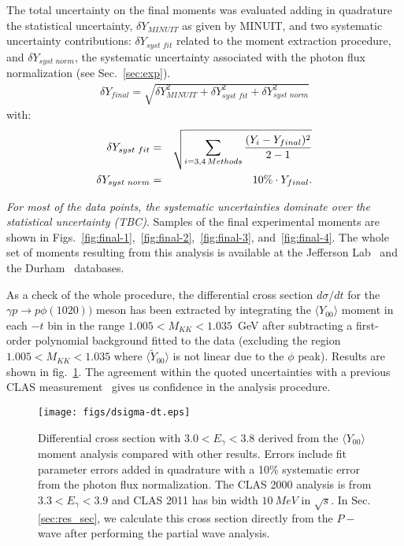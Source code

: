 \documentclass[twocolumn,superscriptaddress,prd]{revtex4}
\begin{document}
The total uncertainty on the final moments was evaluated adding in quadrature
the statistical uncertainty, $\delta Y_{MINUIT}$ as given by MINUIT, and two systematic uncertainty contributions:
$\delta Y_{syst\,\, fit}$ related to the moment extraction procedure, 
and $\delta Y_{syst\,\,  norm}$, the systematic uncertainty  associated with the photon flux normalization (see Sec.~\ref{sec:exp}).
\begin{eqnarray}
\delta Y_{final}=\sqrt{\delta Y_{MINUIT}^2+\delta Y_{syst\,\, fit}^2+\delta Y_{syst\,\, norm}^2}\label{eq:err_Y}
\end{eqnarray}
with:\\
\begin{eqnarray}
\delta Y_{syst\,\,  fit}&=&\sqrt{\sum_{i=3,4 \, Methods}{({Y_i}-Y_{final})^2\over{2-1}}}\\
\delta Y_{syst\,\,  norm}& =& 10\% \cdot Y_{final}.
\end{eqnarray}

{\it For most of  the data points, the systematic uncertainties dominate over the statistical uncertainty (TBC)}.
Samples of the  final experimental moments are shown in Figs.~\ref{fig:final-1},~\ref{fig:final-2},~\ref{fig:final-3}, and~\ref{fig:final-4}.
The whole set of moments resulting from this analysis  is  available at the Jefferson Lab~\cite{jlab-db} and the Durham~\cite{dhuram-db} databases. 




As a check of the whole procedure, the differential cross  section $d\sigma/dt$ for the $\gamma p \to p \phi(1020))$ meson  has been extracted
by integrating  the $\langle Y_{00} \rangle$ moment in each $-t$ bin in the range  $1.005  <M_{KK}< 1.035$~GeV after subtracting a first-order polynomial background fitted to the data (excluding the region $1.005  < M_{KK} < 1.035$ where $\langle\tilde{Y}_{00}\rangle$ is not linear due to the $\phi$ peak).
Results are shown in fig.~\ref{fig:phi_xsec}. 
The agreement within the quoted uncertainties  with a previous CLAS measurement~\cite{phi-clas-2000, phi-clas-2011}
gives us confidence in the analysis procedure.
\begin{figure}[h]
\begin{center}
\texttt{[image: figs/dsigma-dt.eps]}
 \caption{Differential cross section with $ 3.0 <E_{\gamma} < 3.8$ derived from the $\langle Y_{00} \rangle$ moment analysis compared with other results. Errors include fit parameter errors added in quadrature with a 10\% systematic error from the photon flux normalization. The CLAS 2000 analysis \cite{phi-clas-2000} is from $ 3.3 <E_{\gamma} < 3.9$ and CLAS 2011 \cite{phi-clas-2011} has bin width $10 \ MeV$ in $\sqrt{s}$. In Sec.\ref{sec:res_sec}, we calculate this cross section directly from the $P-$wave after performing the partial wave analysis.}
\label{fig:phi_xsec}
 \end{center}
 \end{figure}
\end{document}
